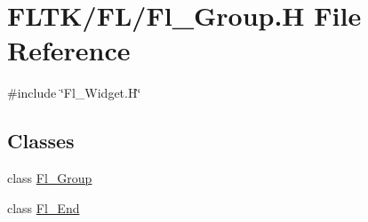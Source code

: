 \hypertarget{_fl___group_8_h}{}\section{F\+L\+T\+K/\+F\+L/\+Fl\+\_\+\+Group.H File Reference}
\label{_fl___group_8_h}
{\ttfamily \#include \char`\"{}Fl\+\_\+\+Widget.\+H\char`\"{}}\newline
\subsection*{Classes}
\begin{DoxyCompactItemize}
\item 
class \hyperlink{class_fl___group}{Fl\+\_\+\+Group}
\item 
class \hyperlink{class_fl___end}{Fl\+\_\+\+End}
\end{DoxyCompactItemize}
